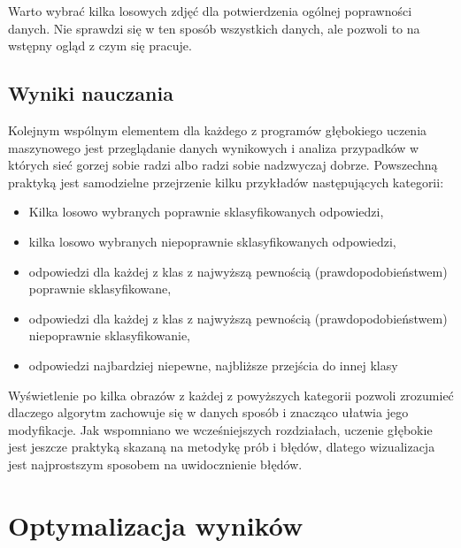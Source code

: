 \documentclass[12pt,a4paper,twoside,titlepage,openright]{book}
\begin{document}
Warto wybrać kilka losowych zdjęć dla potwierdzenia ogólnej poprawności danych. Nie sprawdzi się w ten sposób wszystkich danych, ale pozwoli to na wstępny ogląd z czym się pracuje.

\subsection{Wyniki nauczania}
Kolejnym wspólnym elementem dla każdego z programów głębokiego uczenia maszynowego jest przeglądanie danych wynikowych i analiza przypadków w których sieć gorzej sobie radzi albo radzi sobie nadzwyczaj dobrze. Powszechną praktyką jest samodzielne przejrzenie kilku przykładów następujących kategorii:
\begin{itemize}
\item Kilka losowo wybranych poprawnie sklasyfikowanych odpowiedzi,
\item kilka losowo wybranych niepoprawnie sklasyfikowanych odpowiedzi,
\item odpowiedzi dla każdej z klas z najwyższą pewnością (prawdopodobieństwem) poprawnie sklasyfikowane,
\item odpowiedzi dla każdej z klas z najwyższą pewnością (prawdopodobieństwem) niepoprawnie sklasyfikowanie,
\item odpowiedzi najbardziej niepewne, najbliższe przejścia do innej klasy
\end{itemize}
Wyświetlenie po kilka obrazów z każdej z powyższych kategorii pozwoli zrozumieć dlaczego algorytm zachowuje się w danych sposób i znacząco ułatwia jego modyfikacje. Jak wspomniano we wcześniejszych rozdziałach, uczenie głębokie jest jeszcze praktyką skazaną na metodykę prób i błędów, dlatego wizualizacja jest najprostszym sposobem na uwidocznienie błędów.

\section{Optymalizacja wyników}
\end{document}
